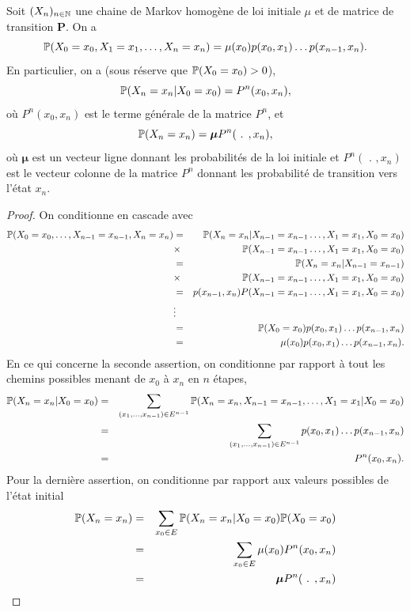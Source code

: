 \begin{prop}
Soit $(X_n)_{n\in\mathbb{N}}$ une chaine de Markov homogène de loi initiale $\mu$ et de matrice de transition $\mathbf{P}$. On a
$$
\mathbb{P}(X_0 = x_0,X_1 = x_1,\ldots, X_n = x_n) = \mu(x_0)p(x_0,x_1)\ldots p(x_{n-1},x_n).
$$
En particulier, on a (sous réserve que $\mathbb{P}(X_0 = x_0)>0$),
$$
\mathbb{P}(X_n = x_n|X_0 = x_0) = P^{n}(x_0, x_n),
$$
où $P^{n}(x_0, x_n)$ est le terme générale de la matrice $P^{n}$, et
$$
\mathbb{P}(X_n = x_n) =  \boldsymbol{\mu} P^{n}(\text{ . } , x_n),
$$
où $\boldsymbol{\mu}$ est un vecteur ligne donnant les probabilités de la loi initiale et $P^{n}(\text{ . } , x_n)$ est le vecteur colonne de la matrice $P^{n}$ donnant les probabilité de transition vers l'état $x_n$.
\end{prop}
\begin{proof}
On conditionne en cascade avec
\begin{eqnarray*}
\mathbb{P}(X_0 = x_0, \ldots, X_{n-1} = x_{n-1}, X_n = x_n) &=& \mathbb{P}(X_n = x_n|X_{n-1} = x_{n-1}\ldots, X_{1} = x_{1}, X_0 = x_0)\\
&\times&\mathbb{P}(X_{n-1} = x_{n-1}\ldots, X_{1} = x_{1}, X_0 = x_0)\\
&=& \mathbb{P}(X_n = x_n|X_{n-1} = x_{n-1})\\
&\times&\mathbb{P}(X_{n-1} = x_{n-1}\ldots, X_{1} = x_{1}, X_0 = x_0)\\
&=& p(x_{n-1},x_n)P(X_{n-1} = x_{n-1}\ldots, X_{1} = x_{1}, X_0 = x_0)\\
&\vdots&\\
&=&\mathbb{P}(X_0= x_0)p(x_0,x_1)\ldots p(x_{n-1}, x_n)\\
&=&\mu(x_0)p(x_0,x_1)\ldots p(x_{n-1}, x_n).
\end{eqnarray*}
En ce qui concerne la seconde assertion, on conditionne par rapport à tout les chemins possibles menant de $x_0$ à $x_n$ en $n$ étapes,
\begin{eqnarray*}
\mathbb{P}(X_n = x_n|X_0 = x_0) &=& \sum_{(x_1,\ldots, x_{n-1})\in E^{n-1}}\mathbb{P}(X_n = x_n, X_{n-1} = x_{n-1},\ldots, X_1 = x_1|X_0 = x_0) \\
&=& \sum_{(x_1,\ldots, x_{n-1})\in E^{n-1}}p(x_0,x_1)\ldots p(x_{n-1}, x_n)\\
&=&P^{n}(x_0,x_n).
\end{eqnarray*}
Pour la dernière assertion, on conditionne par rapport aux valeurs possibles de l'état initial
\begin{eqnarray*}
\mathbb{P}(X_n = x_n) &=& \sum_{x_0\in E}\mathbb{P}(X_n = x_n|X_0 = x_0)\mathbb{P}(X_0 = x_0)\\
&=& \sum_{x_0\in E}\mu(x_0)P^n(x_0,x_n)\\
&=& \boldsymbol{\mu}P^n(\text{ . },x_n)
\end{eqnarray*}
\end{proof}
